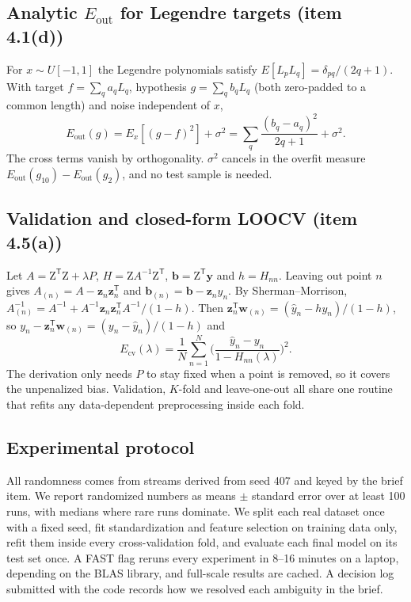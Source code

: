 \documentclass[conference]{IEEEtran}
\newcommand{\Eout}{E_{\mathrm{out}}}
\newcommand{\w}{\mathbf{w}}
\newcommand{\Z}{\mathrm{Z}}
\newcommand{\y}{\mathbf{y}}
\newcommand{\T}{^{\mathsf T}}
\begin{document}
\subsection{Analytic $\Eout$ for Legendre targets (item 4.1(d))}
For $x\sim U[-1,1]$ the Legendre polynomials satisfy $E[L_pL_q]=\delta_{pq}/(2q+1)$. With target $f=\sum_qa_qL_q$, hypothesis $g=\sum_qb_qL_q$ (both zero-padded to a common length) and noise independent of $x$,
\begin{equation}
\Eout(g)=E_x[(g-f)^2]+\sigma^2=\sum_q\frac{(b_q-a_q)^2}{2q+1}+\sigma^2.\label{eq:eout}
\end{equation}
The cross terms vanish by orthogonality. $\sigma^2$ cancels in the overfit measure $\Eout(g_{10})-\Eout(g_2)$, and no test sample is needed.

\subsection{Validation and closed-form LOOCV (item 4.5(a))}
Let $A=\Z\T\Z+\lambda P$, $H=\Z A^{-1}\Z\T$, $\mathbf b=\Z\T\y$ and $h=H_{nn}$. Leaving out point $n$ gives $A_{(n)}=A-\mathbf z_n\mathbf z_n\T$ and $\mathbf b_{(n)}=\mathbf b-\mathbf z_ny_n$. By Sherman--Morrison, $A_{(n)}^{-1}=A^{-1}+A^{-1}\mathbf z_n\mathbf z_n\T A^{-1}/(1-h)$. Then $\mathbf z_n\T\w_{(n)}=(\hat y_n-hy_n)/(1-h)$, so $y_n-\mathbf z_n\T\w_{(n)}=(y_n-\hat y_n)/(1-h)$ and
\begin{equation}
E_{\mathrm{cv}}(\lambda)=\frac1N\sum_{n=1}^N\Big(\frac{\hat y_n-y_n}{1-H_{nn}(\lambda)}\Big)^2.\label{eq:loocv}
\end{equation}
The derivation only needs $P$ to stay fixed when a point is removed, so it covers the unpenalized bias. Validation, $K$-fold and leave-one-out all share one routine that refits any data-dependent preprocessing inside each fold.

\subsection{Experimental protocol}
All randomness comes from streams derived from seed 407 and keyed by the brief item. We report randomized numbers as means $\pm$ standard error over at least 100 runs, with medians where rare runs dominate. We split each real dataset once with a fixed seed, fit standardization and feature selection on training data only, refit them inside every cross-validation fold, and evaluate each final model on its test set once. A FAST flag reruns every experiment in 8--16 minutes on a laptop, depending on the BLAS library, and full-scale results are cached. A decision log submitted with the code records how we resolved each ambiguity in the brief.
\end{document}
